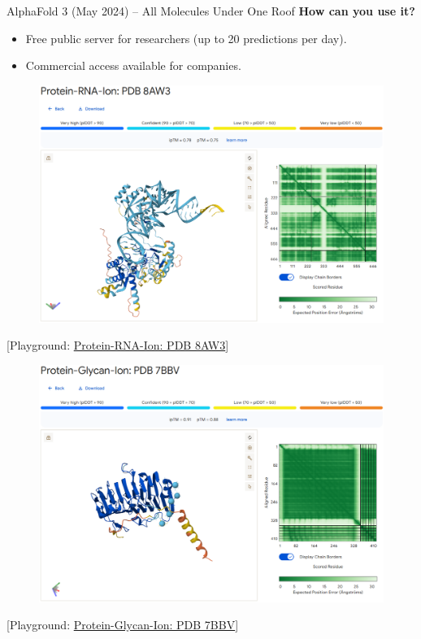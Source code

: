 \begin{frame}[allowframebreaks]{AlphaFold 3 (May 2024) – All Molecules Under One Roof}
    \textbf{How can you use it?}
    \begin{itemize}
        \item Free public server for researchers (up to 20 predictions per day).
        \item Commercial access available for companies.
    \end{itemize}

    \framebreak

    \begin{figure}
        \centering
        \includegraphics[width=\linewidth,height=0.8\textheight,keepaspectratio]{images/science/alphafold-3-playground-1.png}
    \end{figure}
    [Playground: \href{https://alphafoldserver.com/example/examplefold_pdb_8aw3}{Protein-RNA-Ion: PDB 8AW3}]

    \framebreak

    \begin{figure}
        \centering
        \includegraphics[width=\linewidth,height=0.8\textheight,keepaspectratio]{images/science/alphafold-3-playground-2.png}
    \end{figure}
    [Playground: \href{https://alphafoldserver.com/example/examplefold_pdb_7bbv}{Protein-Glycan-Ion: PDB 7BBV}]


\end{frame}
